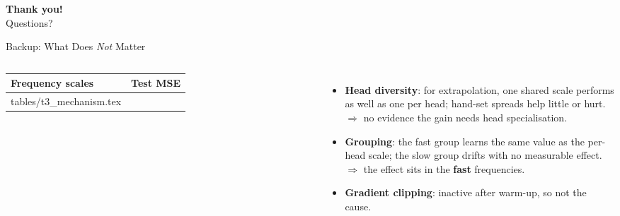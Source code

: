 \documentclass[aspectratio=169,xcolor=dvipsnames]{beamer}
\begin{document}
\begin{frame}[plain]
  \centering
  \Large \textbf{Thank you!}\\[0.5cm]
  \normalsize Questions?
\end{frame}

\appendix

\begin{frame}{Backup: What Does \emph{Not} Matter}
\begin{columns}[c]
\centering\footnotesize
\begin{tabular}{@{}lc@{}}\toprule
Frequency scales & Test MSE\\\midrule
{} tables/t3_mechanism.tex
\bottomrule\end{tabular}
\begin{itemize}\small
\item \textbf{Head diversity}: for extrapolation, one shared scale performs as well as one per head; hand-set spreads help little or hurt.\\$\Rightarrow$ no evidence the gain needs head specialisation.
\item \textbf{Grouping}: the fast group learns the same value as the per-head scale; the slow group drifts with no measurable effect.\\$\Rightarrow$ the effect sits in the \textbf{fast} frequencies.
\item \textbf{Gradient clipping}: inactive after warm-up, so not the cause.
\end{itemize}
\end{columns}
\end{frame}
\end{document}
